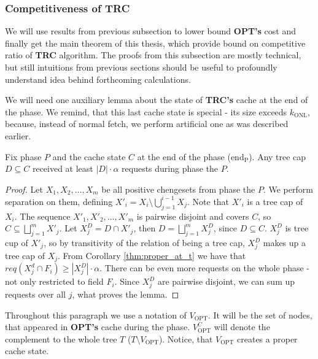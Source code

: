\subsubsection{Competitiveness of TRC}
We will use results from previous subsection to lower bound \textbf{OPT's} cost 
and finally get the main theorem of this thesis, which provide bound on 
competitive ratio of \textbf{TRC} algorithm. The proofs from this subsection are
 mostly technical, but still intuitions from previous sections should be useful 
to profoundly understand idea behind forthcoming calculations.

We will need one auxiliary lemma about the state of \textbf{TRC's} cache at the 
end of the phase. We remind, that this last cache state is special - its size 
exceeds $k_{\mathrm{ONL}}$, because, instead of normal fetch, we perform 
artificial one as was described earlier.  
\begin{lemma}
Fix phase $P$ and the cache state  $C$ at the end of the phase 
($\mathrm{end_P}$). Any tree cap $D \subseteq C$ received at least 
$|D| \cdot \alpha$ requests during phase the $P$.
\label{thm:lots_of_req_in_tc_end_of_p}
\end{lemma}
\begin{proof}
Let $X_1, X_2, \ldots, X_m$ be all positive chengesets from phase the $P$. 
We perform separation on them, defining 
$X'_i = X_i \setminus \bigcup_{j=1}^{i-1} X_j$. Note 
that $X'_i$ is a tree cap of $X_i$. The sequence $X'_1, X'_2, \ldots, X'_m$ is 
pairwise disjoint and covers $C$, so $C \subseteq \bigsqcup_{j=1}^m 
X'_j$. Let $X_j^D = D \cap X'_j$, then $D = \bigsqcup_{j=1}^m X_j^D$, since $D 
\subseteq C$. $X_j^D$ is tree cup of $X'_j$, so by transitivity of the relation 
of being a tree cap, $X_j^D$ makes up a tree cap of $X_j$. From Corollary 
\ref{thm:proper_at_t} we have that $req(X_j^d \cap F_i) \geq |X_j^D| \cdot 
\alpha$. There can be even more requests on the whole phase - not only 
restricted to 
field $F_i$. Since $X_j^D$ are pairwise disjoint, we can sum up requests over 
all $j$, what proves the lemma.
\end{proof}

Throughout this paragraph we use a notation of $V_{\mathrm{OPT}}$. It will be 
the set of nodes, that appeared in \textbf{OPT's} cache during the phase. 
$V_{\mathrm{OPT}}^C$ will 
denote the complement to the whole tree $T$ ($T \setminus V_{\mathrm{OPT}}$). 
Notice, 
that $V_{\mathrm{OPT}}$ creates a proper cache state.

